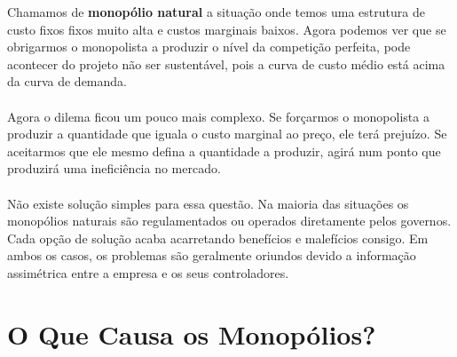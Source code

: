 \documentclass[a4paper,11pt,oneside]{book}
\theoremstyle{definition}
\theoremstyle{break}
\begin{document}
Chamamos de \textbf{monopólio natural} a situação onde temos uma estrutura de custo fixos fixos muito alta e custos marginais baixos. Agora podemos ver que se obrigarmos o monopolista a produzir o nível da competição perfeita, pode acontecer do projeto não ser sustentável, pois a curva de custo médio está acima da curva de demanda.
\\
\\
Agora o dilema ficou um pouco mais complexo. Se forçarmos o monopolista a produzir a quantidade que iguala o custo marginal ao preço, ele terá prejuízo. Se aceitarmos que ele mesmo defina a quantidade a produzir, agirá num ponto que produzirá uma ineficiência no mercado.
\\
\\
Não existe solução simples para essa questão. Na maioria das situações os monopólios naturais são regulamentados ou operados diretamente pelos governos. Cada opção de solução acaba acarretando benefícios e malefícios consigo. Em ambos os casos, os problemas são geralmente oriundos devido a informação assimétrica entre a empresa e os seus controladores.

\section{O Que Causa os Monopólios?}
\end{document}
